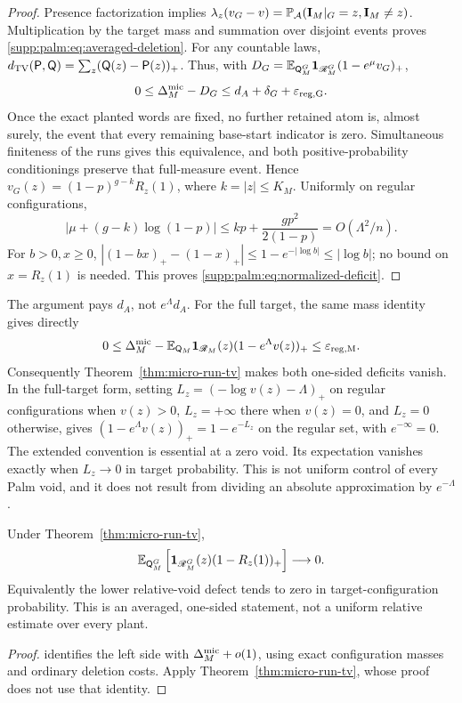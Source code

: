 \begin{proof}
Presence factorization implies
$\lambda_z(v_G-v)=\mathbb P_{\mathcal A}(\mathbf I_M|_G=z,\mathbf I_M\ne z)$.
Multiplication by the target mass and summation over disjoint events proves
\eqref{supp:palm:eq:averaged-deletion}. For any countable laws,
$d_{\mathrm{TV}}(\mathsf P,\mathsf Q)=\sum_z(\mathsf Q(z)-\mathsf P(z))_+$.
Thus, with
$D_G=\mathbb E_{\mathsf Q_M^G}\mathbf 1_{\mathscr R_M^G}(1-e^\mu v_G)_+$,
\[
 0\le\Delta_M^{\rm mic}-D_G\le d_A+\delta_G+\varepsilon_{\rm reg,G}.
\]
Once the exact planted words are fixed, no further retained atom is,
almost surely, the event that every remaining base-start indicator is
zero. Simultaneous finiteness of the runs gives this equivalence, and
both positive-probability conditionings preserve that full-measure event. Hence
$v_G(z)=(1-p)^{g-k}R_z(1)$, where $k=|z|\le K_M$.
Uniformly on regular configurations,
\[
 |\mu+(g-k)\log(1-p)|
     \le kp+\frac{gp^2}{2(1-p)}=O(\Lambda^2/n).
\]
For $b>0,x\ge0$,
$|(1-bx)_+-(1-x)_+|\le1-e^{-|\log b|}\le|\log b|$;
no bound on $x=R_z(1)$ is needed. This proves \eqref{supp:palm:eq:normalized-deficit}.
\end{proof}
The argument pays $d_A$, not $e^\Lambda d_A$. For the full target, the same mass identity gives directly
\[
 0\le\Delta_M^{\rm mic}
   -\mathbb E_{\mathsf Q_M}\mathbf 1_{\mathscr R_M}(z)(1-e^\Lambda v(z))_+
   \le\varepsilon_{\rm reg,M}.
\]
Consequently Theorem~\ref{thm:micro-run-tv} makes both one-sided deficits vanish. In the full-target form, setting
$L_z=(-\log v(z)-\Lambda)_+$ on regular configurations when $v(z)>0$,
$L_z=+\infty$ there when $v(z)=0$, and $L_z=0$ otherwise, gives
$(1-e^\Lambda v(z))_+=1-e^{-L_z}$ on the regular set, with
$e^{-\infty}=0$. The extended convention is essential at a zero void. Its expectation vanishes exactly when $L_z\to0$ in target probability. This is not uniform control of every Palm void, and it does not result from dividing an absolute approximation by $e^{-\Lambda}$.

\begin{corollary}\label{supp:palm:cor:palm-completion}
Under Theorem~\ref{thm:micro-run-tv},
\begin{equation}\label{supp:palm:eq:palm-completion}
 \mathbb E_{\mathsf Q^G_M}\left[
        \mathbf 1_{\mathscr R^G_M}(z)(1-R_z(1))_+\right]\longrightarrow0.
\end{equation}
Equivalently the lower relative-void defect tends to zero in target-configuration probability. This is an averaged, one-sided statement, not a uniform relative estimate over every plant.
\end{corollary}
\begin{proof}
 identifies the left side with
$\Delta_M^{\rm mic}+o(1)$, using exact configuration masses and ordinary deletion costs. Apply Theorem~\ref{thm:micro-run-tv}, whose proof does not use that identity.
\end{proof}

